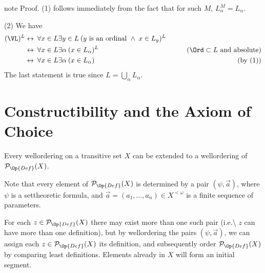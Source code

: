 \documentclass[letterpaper,10pt,english]{jupyterBook}
\begin{document}
\begin{sphinxadmonition}{note}
\sphinxAtStartPar
Proof. (1) follows immediately from the fact that for such \(M\), \(L_\alpha^M = L_\alpha\).

\sphinxAtStartPar
(2) We have
\begin{align*}
    (\VL)^L & \leftrightarrow \: \forall x\in L \exists y \in L \: (y \text{ is an ordinal } \wedge \; x \in L_y)^L & \\
        & \leftrightarrow \: \forall x\in L \exists \alpha \: (x \in L_\alpha)^L  & \qquad \text{($\Ord \subset L$ and absolute)}\\
        & \leftrightarrow \: \forall x\in L \exists \alpha \: (x \in L_\alpha)    & \qquad \text{(by (1))} 
\end{align*}
\sphinxAtStartPar
The last statement is true since \(L = \bigcup_{\alpha} L_\alpha\).
\end{sphinxadmonition}


\section{Constructibility and the Axiom of Choice}
\label{\detokenize{V=L:constructibility-and-the-axiom-of-choice}}
\sphinxAtStartPar
Every well\sphinxhyphen{}ordering on a transitive set \(X\) can be extended to a well\sphinxhyphen{}ordering of \(\mathcal{P}_{\Op{Def}}(X)\).

\sphinxAtStartPar
Note that every element of \(\mathcal{P}_{\Op{Def}}(X)\) is determined by a pair \((\psi, \vec{a})\), where \(\psi\) is a set\sphinxhyphen{}theoretic formula, and \(\vec{a} = (a_1, \dots, a_n) \in X^{<\omega}\) is a finite sequence of parameters.

\sphinxAtStartPar
For each \(z \in \mathcal{P}_{\Op{Def}}(X)\) there may exist more than one such pair (i.e.\textbackslash{} \(z\) can have more than one definition), but by well\sphinxhyphen{}ordering the pairs \((\psi, \vec{a})\), we can assign each \(z \in \mathcal{P}_{\Op{Def}}(X)\) its  definition, and subsequently order \(\mathcal{P}_{\Op{Def}}(X)\) by comparing least definitions. Elements already in \(X\) will form an initial segment.
\end{document}
